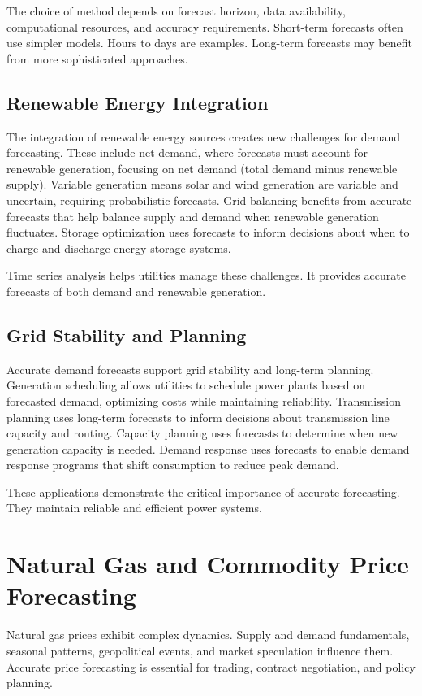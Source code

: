 The choice of method depends on forecast horizon, data availability, computational resources, and accuracy requirements. Short-term forecasts often use simpler models. Hours to days are examples. Long-term forecasts may benefit from more sophisticated approaches.

\subsection{Renewable Energy Integration}

The integration of renewable energy sources creates new challenges for demand forecasting. These include net demand, where forecasts must account for renewable generation, focusing on net demand (total demand minus renewable supply). Variable generation means solar and wind generation are variable and uncertain, requiring probabilistic forecasts. Grid balancing benefits from accurate forecasts that help balance supply and demand when renewable generation fluctuates. Storage optimization uses forecasts to inform decisions about when to charge and discharge energy storage systems.

Time series analysis helps utilities manage these challenges. It provides accurate forecasts of both demand and renewable generation.

\subsection{Grid Stability and Planning}

Accurate demand forecasts support grid stability and long-term planning. Generation scheduling allows utilities to schedule power plants based on forecasted demand, optimizing costs while maintaining reliability. Transmission planning uses long-term forecasts to inform decisions about transmission line capacity and routing. Capacity planning uses forecasts to determine when new generation capacity is needed. Demand response uses forecasts to enable demand response programs that shift consumption to reduce peak demand.

These applications demonstrate the critical importance of accurate forecasting. They maintain reliable and efficient power systems.

\section{Natural Gas and Commodity Price Forecasting}

Natural gas prices exhibit complex dynamics. Supply and demand fundamentals, seasonal patterns, geopolitical events, and market speculation influence them. Accurate price forecasting is essential for trading, contract negotiation, and policy planning.

